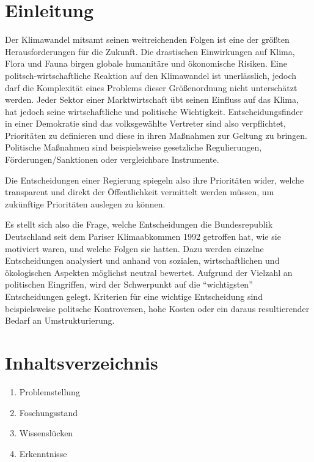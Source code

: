 \documentclass[12pt,a4paper]{article}
\title{\titlename}
\author{ Maylis Grune, Muhammad-Baquier Alrumeil, Nikals Schmidt}
\date{\exposedate}
\begin{document}


\maketitle

\section*{Einleitung}

Der Klimawandel mitsamt seinen weitreichenden Folgen ist  eine der größten Herausforderungen für die Zukunft. 
Die drastischen Einwirkungen auf Klima, Flora und Fauna \autocite{Consequences:2023}
birgen globale humanitäre und ökonomische Risiken. 
Eine politsch-wirtschaftliche Reaktion auf den Klimawandel ist unerlässlich, 
jedoch darf die Komplexität eines Problems dieser Größenordnung nicht unterschätzt werden. Jeder Sektor einer Marktwirtschaft übt seinen 
Einfluss auf das Klima, hat jedoch seine wirtschaftliche und politische Wichtigkeit. 
Entscheidungsfinder \- in einer Demokratie sind das volksgewählte Vertreter \- sind also verpflichtet, Prioritäten zu definieren und diese in 
ihren Maßnahmen zur Geltung zu bringen. Politische Maßnahmen sind beispielsweise gesetzliche Regulierungen, Förderungen/Sanktionen oder vergleichbare Instrumente. 

Die Entscheidungen einer Regierung spiegeln also ihre Prioritäten wider, welche transparent und direkt der Öffentlichkeit vermittelt werden müssen, um zukünftige Prioritäten auslegen zu können. 

Es stellt sich also die Frage, welche Entscheidungen die Bundesrepublik Deutschland seit dem Pariser Klimaabkommen 1992 getroffen hat, wie sie motiviert waren, und welche Folgen sie hatten. Dazu werden einzelne Entscheidungen analysiert und anhand von sozialen, wirtschaftlichen und ökologischen Aspekten möglichst neutral bewertet. 
Aufgrund der Vielzahl an politischen Eingriffen, wird der Schwerpunkt auf die “wichtigsten” Entscheidungen gelegt. Kriterien für eine wichtige Entscheidung sind beispielsweise politsche Kontroversen, hohe Kosten oder ein daraus resultierender Bedarf an Umstrukturierung. 

\section*{Inhaltsverzeichnis}
\begin{enumerate}
	\item Problemstellung
	\item Foschungsstand
	\item Wissenslücken
	\item Erkenntnisse
\end{enumerate}
\end{document}
